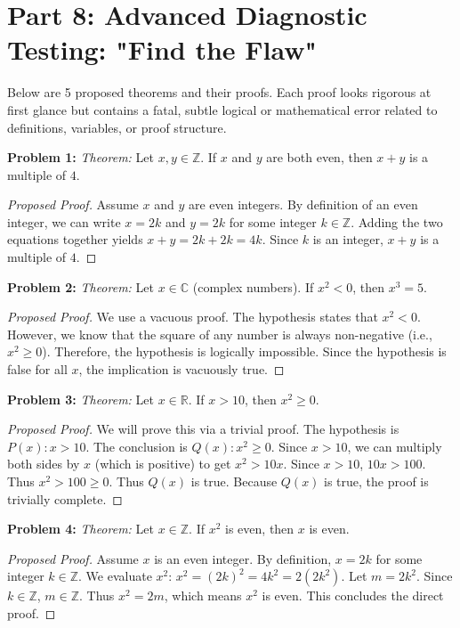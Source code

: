 \documentclass[11pt]{article}
\theoremstyle{remark}
\begin{document}
\newpage
\section{Part 8: Advanced Diagnostic Testing: "Find the Flaw"}

Below are 5 proposed theorems and their proofs. Each proof looks rigorous at first glance but contains a fatal, subtle logical or mathematical error related to definitions, variables, or proof structure.

\textbf{Problem 1:} 
\textit{Theorem:} Let $x, y \in \mathbb{Z}$. If $x$ and $y$ are both even, then $x + y$ is a multiple of $4$.
\begin{proof}[Proposed Proof]
Assume $x$ and $y$ are even integers. By definition of an even integer, we can write $x = 2k$ and $y = 2k$ for some integer $k \in \mathbb{Z}$. Adding the two equations together yields $x + y = 2k + 2k = 4k$. Since $k$ is an integer, $x+y$ is a multiple of $4$.
\end{proof}

\textbf{Problem 2:} 
\textit{Theorem:} Let $x \in \mathbb{C}$ (complex numbers). If $x^2 < 0$, then $x^3 = 5$.
\begin{proof}[Proposed Proof]
We use a vacuous proof. The hypothesis states that $x^2 < 0$. However, we know that the square of any number is always non-negative (i.e., $x^2 \ge 0$). Therefore, the hypothesis is logically impossible. Since the hypothesis is false for all $x$, the implication is vacuously true.
\end{proof}

\textbf{Problem 3:}
\textit{Theorem:} Let $x \in \mathbb{R}$. If $x > 10$, then $x^2 \ge 0$.
\begin{proof}[Proposed Proof]
We will prove this via a trivial proof. The hypothesis is $P(x) : x > 10$. The conclusion is $Q(x) : x^2 \ge 0$. Since $x > 10$, we can multiply both sides by $x$ (which is positive) to get $x^2 > 10x$. Since $x > 10$, $10x > 100$. Thus $x^2 > 100 \ge 0$. Thus $Q(x)$ is true. Because $Q(x)$ is true, the proof is trivially complete.
\end{proof}

\textbf{Problem 4:}
\textit{Theorem:} Let $x \in \mathbb{Z}$. If $x^2$ is even, then $x$ is even.
\begin{proof}[Proposed Proof]
Assume $x$ is an even integer. By definition, $x = 2k$ for some integer $k \in \mathbb{Z}$. We evaluate $x^2$: $x^2 = (2k)^2 = 4k^2 = 2(2k^2)$. Let $m = 2k^2$. Since $k \in \mathbb{Z}$, $m \in \mathbb{Z}$. Thus $x^2 = 2m$, which means $x^2$ is even. This concludes the direct proof.
\end{proof}
\end{document}
